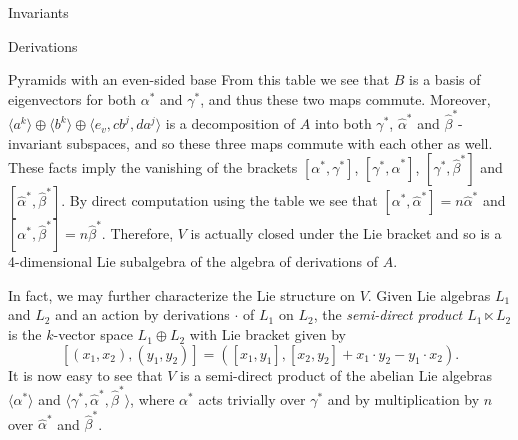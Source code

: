\begin{chapter}{Invariants}
\begin{section}{Derivations}
\begin{subsection}{Pyramids with an even-sided base}
From this table we see that $B$ is a basis of eigenvectors for both $\alpha^*$ and $\gamma^*$, and thus these two maps commute. Moreover, $\langle a^k\rangle \oplus \langle b^k\rangle \oplus \langle e_v, cb^j, da^j\rangle$ is a decomposition of $A$ into both $\gamma^*$, $\hat\alpha^*$ and $\hat\beta^*$-invariant subspaces, and so these three maps commute with each other as well. These facts imply the vanishing of the brackets $[\alpha^*,\gamma^*]$,  $[\gamma^*, \hat\alpha^*]$, $[\gamma^*, \hat\beta^*]$ and $[\hat\alpha^*, \hat\beta^*]$. By direct computation  using the table we see that $[\alpha^*,\hat\alpha^*]=n\hat\alpha^*$ and $[\alpha^*,\hat\beta^*]=n\hat\beta^*$. Therefore, $V$ is actually closed under the Lie bracket and so is a 4-dimensional Lie subalgebra of the algebra of derivations of $A$.

In fact, we may further characterize the Lie structure on $V$. Given Lie algebras $L_1$ and $L_2$ and an action by derivations $\cdot$ of $L_1$ on $L_2$, the \emph{semi-direct product $L_1\ltimes L_2$} is the $k$-vector space $L_1 \oplus L_2$ with Lie bracket given by
\[[(x_1,x_2), (y_1,y_2)] = ([x_1,y_1], [x_2,y_2]+x_1\cdot y_2 - y_1\cdot x_2).\]
It is now easy to see that $V$ is a semi-direct product of the abelian Lie algebras $\langle \alpha^*\rangle$ and $\langle \gamma^*, \hat\alpha^*, \hat\beta^*\rangle$, where $\alpha^*$ acts trivially over $\gamma^*$ and by multiplication by $n$ over $\hat\alpha^*$ and $\hat\beta^*$.
\end{subsection}
\end{section}
\end{chapter}